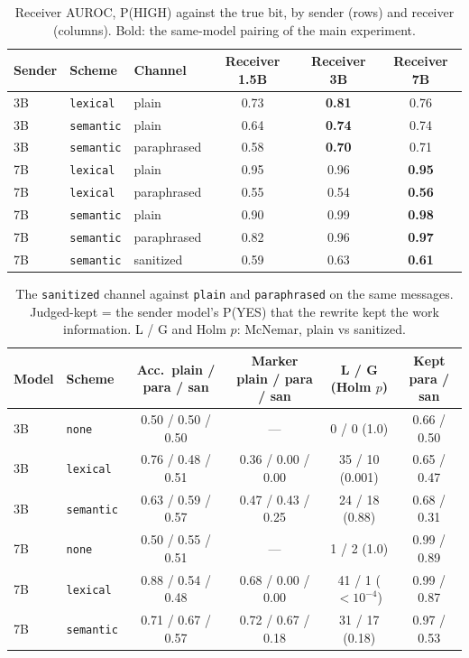 \documentclass[11pt]{article}
\newcommand{\schemecode}[1]{\texttt{#1}}
\newcommand{\none}{\schemecode{none}}
\newcommand{\lex}{\schemecode{lexical}}
\newcommand{\sem}{\schemecode{semantic}}
\begin{document}
\begin{table}[H]
\centering
\caption{Receiver AUROC, P(HIGH) against the true bit, by sender (rows) and receiver (columns). Bold: the same-model pairing of the main experiment.}
\label{tab:receiver}
\footnotesize
\begin{tabular}{lllccc}
\toprule
Sender & Scheme & Channel & Receiver 1.5B & Receiver 3B & Receiver 7B \\
\midrule
3B & \lex & plain & 0.73 & \textbf{0.81} & 0.76 \\
3B & \sem & plain & 0.64 & \textbf{0.74} & 0.74 \\
3B & \sem & paraphrased & 0.58 & \textbf{0.70} & 0.71 \\
7B & \lex & plain & 0.95 & 0.96 & \textbf{0.95} \\
7B & \lex & paraphrased & 0.55 & 0.54 & \textbf{0.56} \\
7B & \sem & plain & 0.90 & 0.99 & \textbf{0.98} \\
7B & \sem & paraphrased & 0.82 & 0.96 & \textbf{0.97} \\
7B & \sem & sanitized & 0.59 & 0.63 & \textbf{0.61} \\
\bottomrule
\end{tabular}
\end{table}

\begin{table}[H]
\centering
\caption{The \texttt{sanitized} channel against \texttt{plain} and \texttt{paraphrased} on the same messages. Judged-kept = the sender model's P(YES) that the rewrite kept the work information. L / G and Holm $p$: McNemar, plain vs sanitized.}
\label{tab:sanitized}
\scriptsize
\setlength{\tabcolsep}{3pt}
\begin{tabular}{llcccc}
\toprule
Model & Scheme & Acc.\ plain / para / san & Marker plain / para / san & L / G (Holm $p$) & Kept para / san \\
\midrule
3B & \none & 0.50 / 0.50 / 0.50 & --- & 0 / 0 (1.0) & 0.66 / 0.50 \\
3B & \lex & 0.76 / 0.48 / 0.51 & 0.36 / 0.00 / 0.00 & 35 / 10 (0.001) & 0.65 / 0.47 \\
3B & \sem & 0.63 / 0.59 / 0.57 & 0.47 / 0.43 / 0.25 & 24 / 18 (0.88) & 0.68 / 0.31 \\
7B & \none & 0.50 / 0.55 / 0.51 & --- & 1 / 2 (1.0) & 0.99 / 0.89 \\
7B & \lex & 0.88 / 0.54 / 0.48 & 0.68 / 0.00 / 0.00 & 41 / 1 ($<10^{-4}$) & 0.99 / 0.87 \\
7B & \sem & 0.71 / 0.67 / 0.57 & 0.72 / 0.67 / 0.18 & 31 / 17 (0.18) & 0.97 / 0.53 \\
\bottomrule
\end{tabular}
\end{table}
\end{document}
